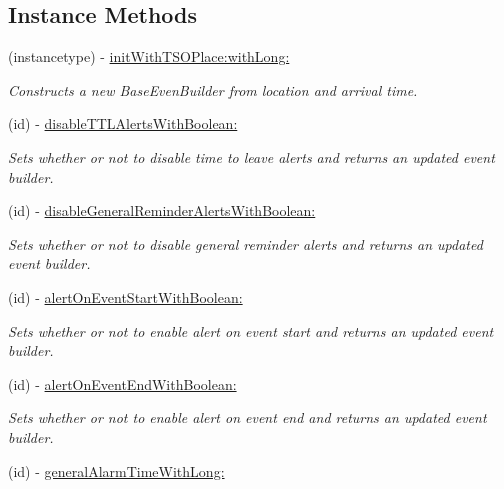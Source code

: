 \subsection*{Instance Methods}
\begin{DoxyCompactItemize}
\item 
(instancetype) -\/ \hyperlink{interface_base_event___base_event_builder_a1be1105c49f37448450aa47e580d6161}{init\+With\+T\+S\+O\+Place\+:with\+Long\+:}
\begin{DoxyCompactList}\small\item\em Constructs a new Base\+Even\+Builder from location and arrival time. \end{DoxyCompactList}\item 
(id) -\/ \hyperlink{interface_base_event___base_event_builder_a54de914bc6988b065d58aa107af488d1}{disable\+T\+T\+L\+Alerts\+With\+Boolean\+:}
\begin{DoxyCompactList}\small\item\em Sets whether or not to disable time to leave alerts and returns an updated event builder. \end{DoxyCompactList}\item 
(id) -\/ \hyperlink{interface_base_event___base_event_builder_a736258c7862b195534e75559ccbd7c54}{disable\+General\+Reminder\+Alerts\+With\+Boolean\+:}
\begin{DoxyCompactList}\small\item\em Sets whether or not to disable general reminder alerts and returns an updated event builder. \end{DoxyCompactList}\item 
(id) -\/ \hyperlink{interface_base_event___base_event_builder_a469e98fe142c0443dfa482f1194265cf}{alert\+On\+Event\+Start\+With\+Boolean\+:}
\begin{DoxyCompactList}\small\item\em Sets whether or not to enable alert on event start and returns an updated event builder. \end{DoxyCompactList}\item 
(id) -\/ \hyperlink{interface_base_event___base_event_builder_a21ccbee7228b4912c53b5abac626ee1c}{alert\+On\+Event\+End\+With\+Boolean\+:}
\begin{DoxyCompactList}\small\item\em Sets whether or not to enable alert on event end and returns an updated event builder. \end{DoxyCompactList}\item 
(id) -\/ \hyperlink{interface_base_event___base_event_builder_a2ce08e7f5edfc20cec610af526bd0f6c}{general\+Alarm\+Time\+With\+Long\+:}

\end{DoxyCompactItemize}
